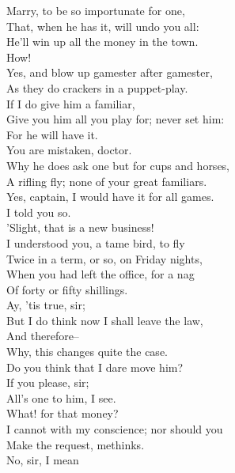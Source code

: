 \documentclass{memoir}
\begin{document}
\begin{drama*}
\subtlespeaks  Marry, to be so importunate for one,\\
 That, when he has it, will undo you all:\\
 He'll win up all the money in the town.\\
\facespeaks  How!\\
\subtlespeaks {} Yes, and blow up gamester after gamester,\\
 As they do crackers in a puppet-play.\\
 If I do give him a familiar,\\
 Give you him all you play for; never set him:\\
 For he will have it.\\
\facespeaks {} You are mistaken, doctor.\\
 Why he does ask one but for cups and horses,\\
 A rifling fly; none of your great familiars.\\
\dapperspeaks  Yes, captain, I would have it for all games.\\
\subtlespeaks  I told you so.\\
\facespeaks {} 'Slight, that is a new business!\\
 I understood you, a tame bird, to fly\\
 Twice in a term, or so, on Friday nights,\\
 When you had left the office, for a nag\\
 Of forty or fifty shillings.\\
\dapperspeaks {} Ay, 'tis true, sir;\\
 But I do think now I shall leave the law,\\
 And therefore--\\
\facespeaks {} Why, this changes quite the case.\\
 Do you think that I dare move him?\\
\dapperspeaks {} If you please, sir;\\
 All's one to him, I see.\\
\facespeaks {} What! for that money?\\
 I cannot with my conscience; nor should you\\
 Make the request, methinks.\\
\dapperspeaks {} No, sir, I mean\\

\end{drama*}
\end{document}
